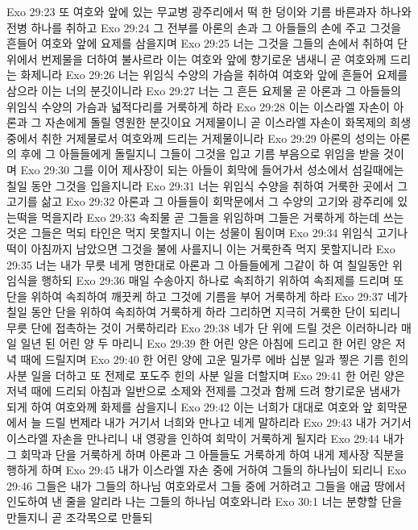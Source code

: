 Exo 29:23  또 여호와 앞에 있는 무교병 광주리에서 떡 한 덩이와 기름 바른과자 하나와 전병 하나를 취하고
Exo 29:24  그 전부를 아론의 손과 그 아들들의 손에 주고 그것을 흔들어 여호와 앞에 요제를 삼을지며
Exo 29:25  너는 그것을 그들의 손에서 취하여 단 위에서 번제물을 더하여 불사르라 이는 여호와 앞에 향기로운 냄새니 곧 여호와께 드리는 화제니라
Exo 29:26  너는 위임식 수양의 가슴을 취하여 여호와 앞에 흔들어 요제를 삼으라 이는 너의 분깃이니라
Exo 29:27  너는 그 흔든 요제물 곧 아론과 그 아들들의 위임식 수양의 가슴과 넓적다리를 거룩하게 하라
Exo 29:28  이는 이스라엘 자손이 아론과 그 자손에게 돌릴 영원한 분깃이요 거제물이니 곧 이스라엘 자손이 화목제의 희생 중에서 취한 거제물로서 여호와께 드리는 거제물이니라
Exo 29:29  아론의 성의는 아론의 후에 그 아들들에게 돌릴지니 그들이 그것을 입고 기름 부음으로 위임을 받을 것이며
Exo 29:30  그를 이어 제사장이 되는 아들이 회막에 들어가서 성소에서 섬길때에는 칠일 동안 그것을 입을지니라
Exo 29:31  너는 위임식 수양을 취하여 거룩한 곳에서 그 고기를 삶고
Exo 29:32  아론과 그 아들들이 회막문에서 그 수양의 고기와 광주리에 있는떡을 먹을지라
Exo 29:33  속죄물 곧 그들을 위임하며 그들은 거룩하게 하는데 쓰는것은 그들은 먹되 타인은 먹지 못할지니 이는 성물이 됨이며
Exo 29:34  위임식 고기나 떡이 아침까지 남았으면 그것을 불에 사를지니 이는 거룩한즉 먹지 못할지니라
Exo 29:35  너는 내가 무릇 네게 명한대로 아론과 그 아들들에게 그같이 하 여 칠일동안 위임식을 행하되
Exo 29:36  매일 수송아지 하나로 속죄하기 위하여 속죄제를 드리며 또 단을 위하여 속죄하여 깨끗케 하고 그것에 기름을 부어 거룩하게 하라
Exo 29:37  네가 칠일 동안 단을 위하여 속죄하여 거룩하게 하라 그리하면 지극히 거룩한 단이 되리니 무릇 단에 접촉하는 것이 거룩하리라
Exo 29:38  네가 단 위에 드릴 것은 이러하니라 매일 일년 된 어린 양 두 마리니
Exo 29:39  한 어린 양은 아침에 드리고 한 어린 양은 저녁 때에 드릴지며
Exo 29:40  한 어린 양에 고운 밀가루 에바 십분 일과 찧은 기름 힌의 사분 일을 더하고 또 전제로 포도주 힌의 사분 일을 더할지며
Exo 29:41  한 어린 양은 저녁 때에 드리되 아침과 일반으로 소제와 전제를 그것과 함께 드려 향기로운 냄새가 되게 하여 여호와께 화제를 삼을지니
Exo 29:42  이는 너희가 대대로 여호와 앞 회막문에서 늘 드릴 번제라 내가 거기서 너희와 만나고 네게 말하리라
Exo 29:43  내가 거기서 이스라엘 자손을 만나리니 내 영광을 인하여 회막이 거룩하게 될지라
Exo 29:44  내가 그 회막과 단을 거룩하게 하며 아론과 그 아들들도 거룩하게 하여 내게 제사장 직분을 행하게 하며
Exo 29:45  내가 이스라엘 자손 중에 거하여 그들의 하나님이 되리니
Exo 29:46  그들은 내가 그들의 하나님 여호와로서 그들 중에 거하려고 그들을 애굽 땅에서 인도하여 낸 줄을 알리라 나는 그들의 하나님 여호와니라
Exo 30:1  너는 분향할 단을 만들지니 곧 조각목으로 만들되
